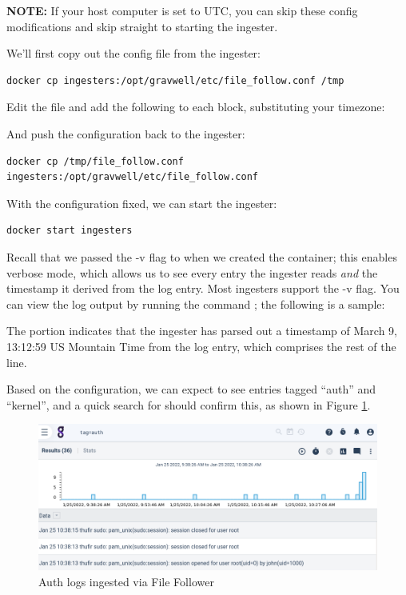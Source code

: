 \textbf{NOTE:} If your host computer is set to UTC, you can skip these config modifications and skip straight to starting the ingester.

We'll first copy out the config file from the ingester:

\begin{Verbatim}[breaklines=true]
docker cp ingesters:/opt/gravwell/etc/file_follow.conf /tmp
\end{Verbatim}

Edit the file and add the following to each
block, substituting your timezone:


And push the configuration back to the ingester:

\begin{Verbatim}[breaklines=true]
docker cp /tmp/file_follow.conf ingesters:/opt/gravwell/etc/file_follow.conf 
\end{Verbatim}

With the configuration fixed, we can start the ingester:

\begin{Verbatim}[breaklines=true]
docker start ingesters
\end{Verbatim}

Recall that we passed the -v flag to 
when we created the container; this enables verbose mode, which allows us to see every entry
the ingester reads \emph{and} the timestamp it derived from the log entry.
Most ingesters support the -v flag. You can view the log output by running
the command ; the following is a sample:


The portion  indicates that the
ingester has parsed out a timestamp of March 9, 13:12:59 US Mountain
Time from the log entry, which comprises the rest of the line.

Based on the configuration, we can expect to see entries tagged
``auth'' and ``kernel'', and a quick search for  should
confirm this, as shown in Figure \ref{fig:file-follow-lab}.

\begin{figure}
	\includegraphics{images/igst-filefollow-lab.png}
	\caption{Auth logs ingested via File Follower}
	\label{fig:file-follow-lab}
\end{figure}

